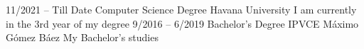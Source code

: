 \documentclass[9pt]{developercv} %
\begin{document}


\begin{entrylist}
	\entry
	{11/2021 -- Till Date}
	{Computer Science Degree}
	{Havana University}
	{I am currently in the 3rd year of my degree}
	\entry
	{9/2016 -- 6/2019}
	{Bachelor's Degree}
	{IPVCE M\'aximo G\'omez B\'aez}
	{My Bachelor's studies}
\end{entrylist}

\end{document}
